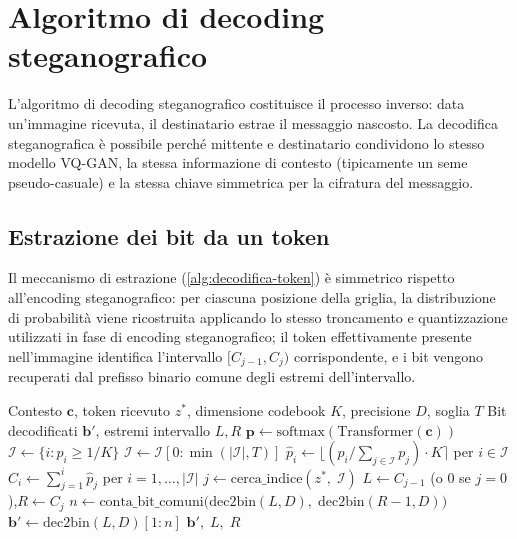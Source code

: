 \section{Algoritmo di decoding steganografico}
\label{sec:decoding-algorithm}

L'algoritmo di decoding steganografico costituisce il processo inverso: data un'immagine ricevuta, il destinatario estrae il messaggio nascosto. La decodifica steganografica è possibile perché mittente e destinatario condividono lo stesso modello VQ-GAN, la stessa informazione di contesto (tipicamente un seme pseudo-casuale) e la stessa chiave simmetrica per la cifratura del messaggio.

\subsection{Estrazione dei bit da un token}

Il meccanismo di estrazione (\autoref{alg:decodifica-token}) è simmetrico rispetto all'encoding steganografico: per ciascuna posizione della griglia, la distribuzione di probabilità viene ricostruita applicando lo stesso troncamento e quantizzazione utilizzati in fase di encoding steganografico; il token effettivamente presente nell'immagine identifica l'intervallo $[C_{j-1}, C_j)$ corrispondente, e i bit vengono recuperati dal prefisso binario comune degli estremi dell'intervallo.

\begin{algorithm}[htbp]
\caption{Decodifica steganografica dei bit da un token visivo}
\label{alg:decodifica-token}
\begin{algorithmic}[1]
\Require Contesto $\mathbf{c}$, token ricevuto $z^*$, dimensione codebook $K$, precisione $D$, soglia $T$
\Ensure Bit decodificati $\mathbf{b}'$, estremi intervallo $L, R$
\State $\mathbf{p} \gets \mathrm{softmax}(\mathrm{Transformer}(\mathbf{c}))$
\State $\mathcal{I} \gets \{i : p_i \ge 1/K\}$ 
\State $\mathcal{I} \gets \mathcal{I}[0:\min(|\mathcal{I}|, T)]$
\State $\hat{p}_i \gets \bigl\lfloor (p_i / \textstyle\sum_{j \in \mathcal{I}} p_j) \cdot K \bigr\rceil$ per $i \in \mathcal{I}$
\State $C_i \gets \textstyle\sum_{j=1}^{i} \hat{p}_j$ per $i = 1, \dots, |\mathcal{I}|$
\State $j \gets \mathrm{cerca\_indice}(z^*,\; \mathcal{I})$ 
\State $L \gets C_{j-1}$ (o $0$ se $j=0$),\quad $R \gets C_j$
\State $n \gets \mathrm{conta\_bit\_comuni}\bigl(\mathrm{dec2bin}(L, D),\; \mathrm{dec2bin}(R-1, D)\bigr)$
\State $\mathbf{b}' \gets \mathrm{dec2bin}(L, D)[1:n]$
\State \Return $\mathbf{b}',\; L,\; R$
\end{algorithmic}
\end{algorithm}

